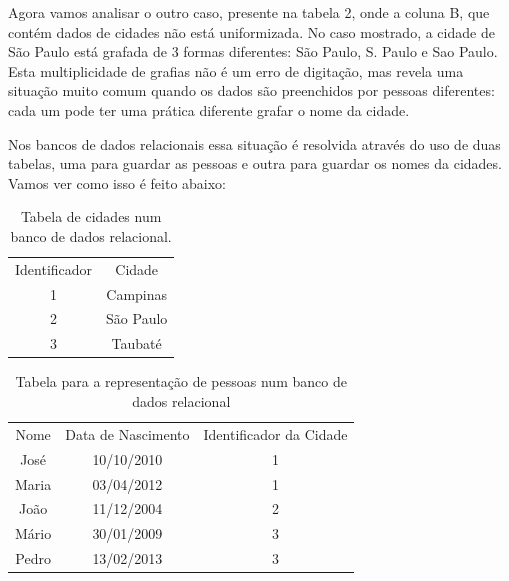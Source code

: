 \documentclass[
12pt,		%
openright,	%
twoside,  %
a4paper,			%
chapter=TITLE,		%
english,			%
french,				%
spanish,			%
brazil				%
]{USPSC-classe/USPSC}
\begin{document}
Agora vamos analisar o outro caso, presente na tabela 2, onde a coluna B, que cont\'em dados de cidades n\~ao est\'a uniformizada. No caso mostrado, a cidade de S\~ao Paulo est\'a grafada de 3 formas diferentes: S\~ao Paulo, S. Paulo e Sao Paulo. Esta multiplicidade de grafias n\~ao \'e um erro de digita\c{c}\~ao, mas revela uma situa\c{c}\~ao muito comum quando os dados s\~ao preenchidos por pessoas diferentes: cada um pode ter uma pr\'atica diferente grafar o nome da cidade.









Nos bancos de dados relacionais essa situa\c{c}\~ao \'e resolvida atrav\'es do uso de duas tabelas, uma para guardar as pessoas e outra para guardar os nomes da cidades. Vamos ver como isso \'e feito abaixo:













\begin{table}[htb]
\tiny
\caption{\label{e4d91173469576e32f3571663aaeb94e34415b3e}Tabela de cidades num banco de dados relacional.}

\centering
\begin{tabular}{|c|c|}
\hline
Identificador  &  Cidade \\
1  &  Campinas \\
2  &  S\~ao Paulo \\
3  &  Taubat\'e \\
\hline
\end{tabular}
\end{table}






\begin{table}[htb]
\tiny
\caption{\label{559b867b37e81cc1a5e7621bf9c9ed9b847f27fc}Tabela para a representa\c{c}\~ao de pessoas num banco de dados relacional}

\centering
\begin{tabular}{|c|c|c|}
\hline
Nome  &  Data de Nascimento  &  Identificador da Cidade \\
Jos\'e  &  10/10/2010  &  1 \\
Maria  & 03/04/2012  &  1 \\
Jo\~ao  &  11/12/2004  &  2 \\
M\'ario  & 30/01/2009  &  3 \\
Pedro  & 13/02/2013  &  3 \\
\hline
\end{tabular}
\end{table}
\end{document}
